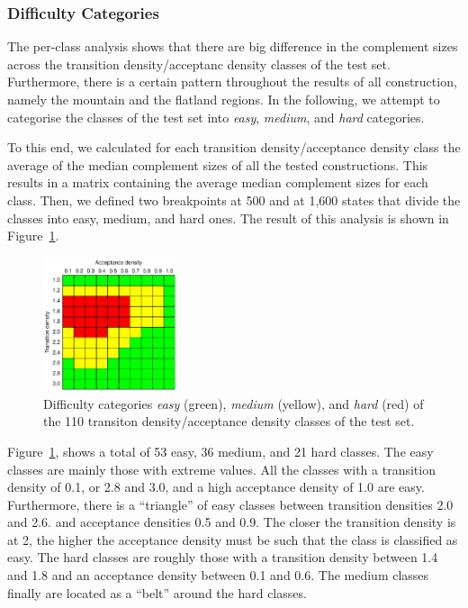 \subsubsection{Difficulty Categories}
The per-class analysis shows that there are big difference in the complement sizes across the transition density/acceptanc density classes of the \goal{} test set. Furthermore, there is a certain pattern throughout the results of all construction, namely the mountain and the flatland regions. In the following, we attempt to categorise the classes of the \goal{} test set into \textit{easy}, \textit{medium}, and \textit{hard} categories. 

To this end, we calculated for each transition density/acceptance density class the average of the median complement sizes of all the tested constructions. This results in a matrix containing the average median complement sizes for each class. Then, we defined two breakpoints at 500 and at 1,600 states that divide the classes into easy, medium, and hard ones. The result of this analysis is shown in Figure~\ref{i.g.difficulty}.

\begin{figure}[ht]
\centering
\includegraphics[width=0.35\textwidth]{figures/r/internal/goal/difficulty.pdf}
\caption{Difficulty categories \textit{easy} (green), \textit{medium} (yellow), and \textit{hard} (red) of the 110 transiton density/acceptance density classes of the \goal{} test set.}
\label{i.g.difficulty}
\end{figure}

Figure~\ref{i.g.difficulty}, shows a total of  53 easy, 36 medium, and 21 hard classes. The easy classes are mainly those with extreme values. All the classes with a transition density of 0.1, or 2.8 and 3.0, and a high acceptance density of 1.0 are easy. Furthermore, there is a ``triangle'' of easy classes between transition densities 2.0 and 2.6. and acceptance densities 0.5 and 0.9. The closer the transition density is at 2, the higher the acceptance density must be such that the class is classified as easy. The hard classes are roughly those with a transition density between 1.4 and 1.8 and an acceptance density between 0.1 and 0.6. The medium classes finally are located as a ``belt'' around the hard classes.

